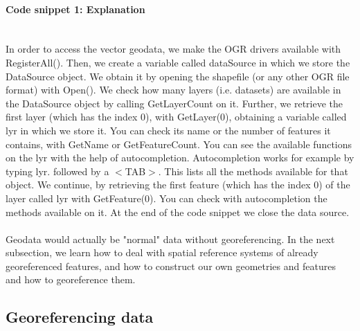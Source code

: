 \documentclass {article}
\begin{document}
\paragraph {Code snippet 1: Explanation}
\\
In order to access the vector geodata, we make the OGR drivers available with RegisterAll(). 
Then, we create a variable called dataSource in which we store the DataSource object. We obtain it by opening the shapefile (or any other OGR file format) with Open(). 
We check how many layers (i.e. datasets) are available in the DataSource object by calling GetLayerCount on it. 
Further, we retrieve the first layer (which has the index 0), with GetLayer(0), obtaining a variable called lyr in which we store it. 
You can check its name or the number of features it contains, with GetName or GetFeatureCount. You can see the available functions on the lyr with the help of autocompletion. Autocompletion works for example by typing lyr. followed by a $<$TAB$>$. This lists all the methods available for that object. 
We continue, by retrieving the first feature (which has the index 0) of the layer called lyr with GetFeature(0). You can check with autocompletion the methods available on it.  
At the end of the code snippet we close the data source.      
\\
\\
Geodata would actually be "normal" data without georeferencing. In the next subsection, we learn how to deal with spatial reference systems of already georeferenced features, and how to construct our own geometries and features and how to georeference them. 

   

\subsection {Georeferencing data}      
\end{document}
